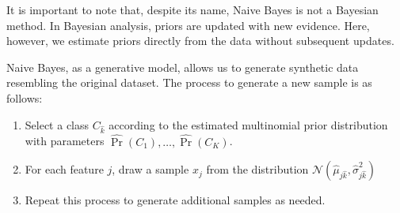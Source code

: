 It is important to note that, despite its name, Naive Bayes is not a Bayesian method. 
In Bayesian analysis, priors are updated with new evidence. 
Here, however, we estimate priors directly from the data without subsequent updates.

Naive Bayes, as a generative model, allows us to generate synthetic data resembling the original dataset. 
The process to generate a new sample is as follows:
\begin{enumerate}
    \item Select a class $C_{\hat{k}}$ according to the estimated multinomial prior distribution with parameters $\hat{\Pr}(C_1),\dots,\hat{\Pr}(C_K)$.
    \item For each feature $j$, draw a sample $x_j$ from the distribution $\mathcal{N}(\hat{\mu}_{j\hat{k}},\hat{\sigma}^2_{j\hat{k}})$
    \item Repeat this process to generate additional samples as needed.
\end{enumerate}

